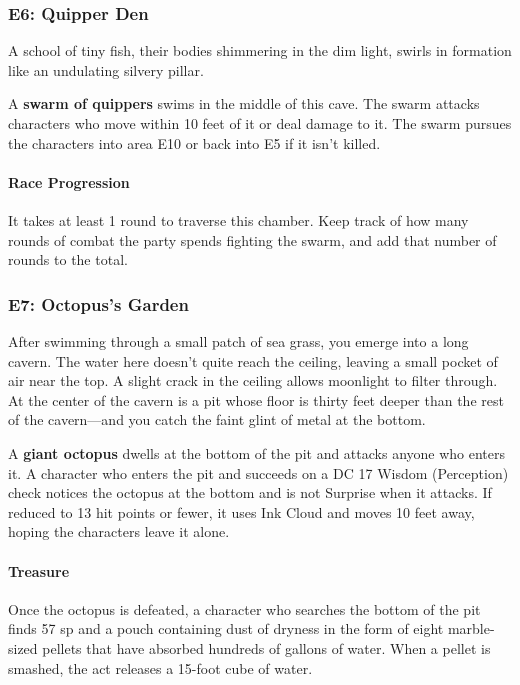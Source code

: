 \documentclass[10pt,a4,twoside,twocolumn,openany,nodeprecatedcode]{dndbook}
\begin{document}
\subsubsection{E6: Quipper Den}
\begin{DndReadAloud}{}
A school of tiny fish, their bodies shimmering in the dim light, swirls in formation like an undulating silvery pillar.
\end{DndReadAloud}

A \textbf{swarm of quippers} swims in the middle of this cave. The swarm attacks characters who move within 10 feet of it or deal damage to it. The swarm pursues the characters into area E10 or back into E5 if it isn't killed.
\paragraph{Race Progression}
It takes at least 1 round to traverse this chamber. Keep track of how many rounds of combat the party spends fighting the swarm, and add that number of rounds to the total.
\subsubsection{E7: Octopus's Garden}
\begin{DndReadAloud}{}
After swimming through a small patch of sea grass, you emerge into a long cavern. The water here doesn't quite reach the ceiling, leaving a small pocket of air near the top. A slight crack in the ceiling allows moonlight to filter through. At the center of the cavern is a pit whose floor is thirty feet deeper than the rest of the cavern—and you catch the faint glint of metal at the bottom.
\end{DndReadAloud}

A \textbf{giant octopus} dwells at the bottom of the pit and attacks anyone who enters it. A character who enters the pit and succeeds on a DC 17 Wisdom (Perception) check notices the octopus at the bottom and is not Surprise when it attacks. If reduced to 13 hit points or fewer, it uses Ink Cloud and moves 10 feet away, hoping the characters leave it alone.
\paragraph{Treasure}
Once the octopus is defeated, a character who searches the bottom of the pit finds 57 sp and a pouch containing dust of dryness in the form of eight marble-sized pellets that have absorbed hundreds of gallons of water. When a pellet is smashed, the act releases a 15-foot cube of water.
\end{document}
